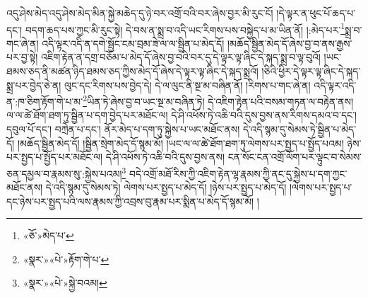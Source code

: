 འདུ་ཤེས་མེད་འདུ་ཤེས་མེད་མིན་སྐྱེ་མཆེད་དུ་ཉེ་བར་འགྲོ་བའི་བར་ཞེས་བྱར་མི་རུང་ངོ། །དེ་ལྟར་ན་ཕུང་པོ་ཆད་པ་དང་། བདག་ཆད་པས་ཀྱང་མི་རུང་སྟེ། དེ་བས་ན་སྨྲ་བ་འདི་ཡང་རིགས་པས་བསྐྱེད་པ་མ་ཡིན་ནོ། །:མེད་པར་\footnote{«ཅོ་»མེད་པ་}སྨྲ་བ་གང་ཞེ་ན། འདི་ལྟར་འདི་ན་དགེ་སྦྱོང་ངམ་བྲམ་ཟེ་ལ་ལ་སྦྱིན་པ་མེད་དོ། །མཆོད་སྦྱིན་མེད་དོ་ཞེས་བྱ་བ་ནས་རྒྱས་པར་བྱ་སྟེ། འཇིག་རྟེན་ན་དགྲ་བཅོམ་པ་མེད་དོ་ཞེས་བྱ་བའི་བར་དུ་དེ་ལྟར་ལྟ་ཞིང་དེ་སྐད་སྨྲ་བ་ལྟ་བུའོ། །ཡང་ཐམས་ཅད་ནི་མཚན་ཉིད་ཐམས་ཅད་ཀྱིས་མེད་དོ་ཞེས་དེ་ལྟར་ལྟ་ཞིང་དེ་སྐད་སྨྲའོ། །ཅིའི་ཕྱིར་དེ་ལྟར་ལྟ་ཞིང་དེ་སྐད་སྨྲ་པར་བྱེད་ཅེ་ན། ལུང་དང་རིགས་པས་བྱེད་དེ། དེ་ལ་ལུང་ནི་སྔ་མ་བཞིན་ནོ། །རིགས་པ་གང་ཞེ་ན། འདི་ལྟར་འདི་ན་:ཁ་ཅིག་རྟོག་གེ་པ་མ་\footnote{«སྣར་»«པེ་»རྟོག་གེ་པ་}ཡིན་ཏེ་ཞེས་བྱ་བ་ཡང་སྔ་མ་བཞིན་ཏེ། དེ་འཇིག་རྟེན་པའི་བསམ་གཏན་ལ་བརྟེན་ནས། ལ་ལ་ཚེ་ཐོག་ཐག་ཏུ་སྦྱིན་པ་དག་བྱེད་པར་མཐོང་ལ། དེ་ཤི་འཕོས་ཏེ་འཆི་བའི་དུས་བྱས་ནས་རིགས་དམའ་བ་དང་། དབུལ་པོ་དང་། བཀྲེན་པ་དང་། ནོར་མེད་པ་དག་ཏུ་སྐྱེས་པ་ཡང་མཐོང་ནས། དེ་འདི་སྙམ་དུ་སེམས་ཏེ་སྦྱིན་པ་མེད་དོ། །མཆོད་སྦྱིན་མེད་དོ། །སྦྱིན་སྲེག་མེད་དོ་སྙམ་མོ། །ཡང་ལ་ལ་ཚེ་ཐོག་ཐག་ཏུ་ལེགས་པར་སྤྱད་པ་སྤྱོད་པའམ། ཉེས་པར་སྤྱད་པ་སྤྱོད་པར་མཐོང་ལ། དེ་ཤི་འཕོས་ཏེ་འཆི་བའི་དུས་བྱས་ནས། ངན་སོང་ངན་འགྲོ་ལོག་པར་ལྟུང་བ་སེམས་ཅན་དམྱལ་བ་རྣམས་སུ་:སྐྱེས་པའམ།\footnote{«སྣར་»«པེ་»སྐྱེ་བའམ།} བདེ་འགྲོ་མཐོ་རིས་ཀྱི་འཇིག་རྟེན་ལྷ་རྣམས་ཀྱི་ནང་དུ་སྐྱེས་པ་དག་ཀྱང་མཐོང་ནས། དེ་འདི་སྙམ་དུ་སེམས་ཏེ། ལེགས་པར་སྤྱད་པ་མེད་དོ། །ཉེས་པར་སྤྱད་པ་མེད་དོ། །ལེགས་པར་སྤྱད་པ་དང་ཉེས་པར་སྤྱད་པའི་ལས་རྣམས་ཀྱི་འབྲས་བུ་རྣམ་པར་སྨིན་པ་མེད་དོ་སྙམ་མོ། །
